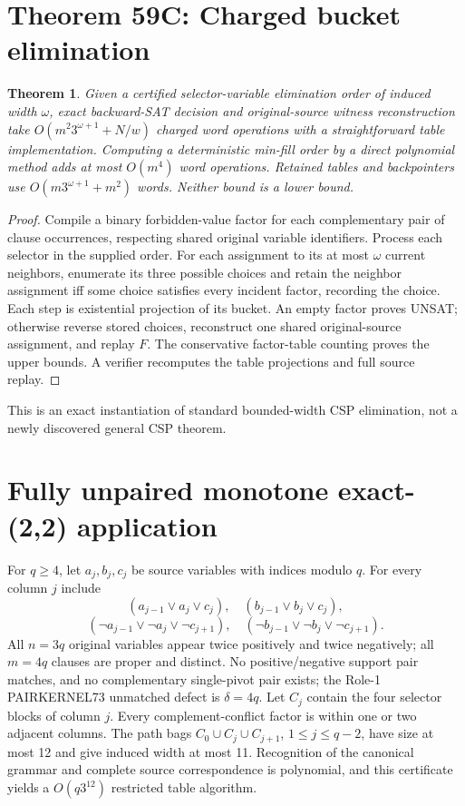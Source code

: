 \documentclass[10pt]{article}
\newtheorem{theorem}{Theorem}
\begin{document}
\section{Theorem 59C: Charged bucket elimination}
\begin{theorem}
Given a certified selector-variable elimination order of induced width $\omega$, exact backward-SAT decision and original-source witness reconstruction take $O(m^2 3^{\omega+1}+N/w)$ charged word operations with a straightforward table implementation. Computing a deterministic min-fill order by a direct polynomial method adds at most $O(m^4)$ word operations. Retained tables and backpointers use $O(m3^{\omega+1}+m^2)$ words. Neither bound is a lower bound.
\end{theorem}
\begin{proof}
Compile a binary forbidden-value factor for each complementary pair of clause occurrences, respecting shared original variable identifiers. Process each selector in the supplied order. For each assignment to its at most $\omega$ current neighbors, enumerate its three possible choices and retain the neighbor assignment iff some choice satisfies every incident factor, recording the choice. Each step is existential projection of its bucket. An empty factor proves UNSAT; otherwise reverse stored choices, reconstruct one shared original-source assignment, and replay $F$. The conservative factor-table counting proves the upper bounds. A verifier recomputes the table projections and full source replay.
\end{proof}
This is an exact instantiation of standard bounded-width CSP elimination, not a newly discovered general CSP theorem.

\section{Fully unpaired monotone exact-(2,2) application}
For $q\ge4$, let $a_j,b_j,c_j$ be source variables with indices modulo $q$. For every column $j$ include
\[
(a_{j-1}\vee a_j\vee c_j),\quad(b_{j-1}\vee b_j\vee c_j),
\]
\[
(\neg a_{j-1}\vee\neg a_j\vee\neg c_{j+1}),\quad
(\neg b_{j-1}\vee\neg b_j\vee\neg c_{j+1}).
\]
All $n=3q$ original variables appear twice positively and twice negatively; all $m=4q$ clauses are proper and distinct. No positive/negative support pair matches, and no complementary single-pivot pair exists; the Role-1 PAIRKERNEL73 unmatched defect is $\delta=4q$. Let $C_j$ contain the four selector blocks of column $j$. Every complement-conflict factor is within one or two adjacent columns. The path bags $C_0\cup C_j\cup C_{j+1}$, $1\le j\le q-2$, have size at most 12 and give induced width at most 11. Recognition of the canonical grammar and complete source correspondence is polynomial, and this certificate yields a $O(q3^{12})$ restricted table algorithm.
\end{document}
